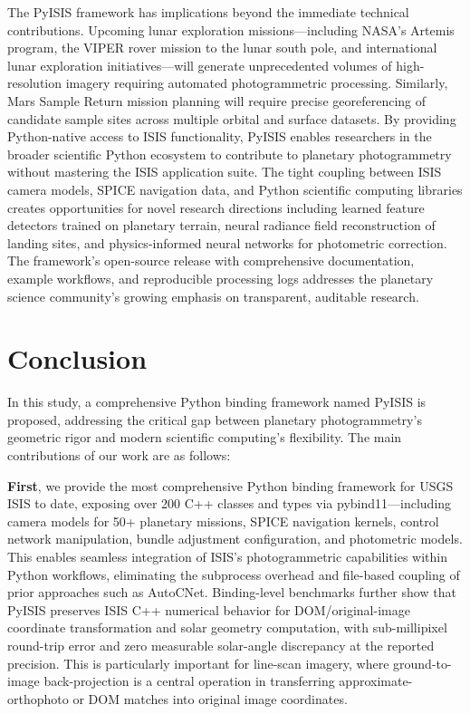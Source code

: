 \documentclass[lettersize,journal]{IEEEtran}
\newcommand{\pyisis}{PyISIS}
\begin{document}
The \pyisis{} framework has implications beyond the immediate technical contributions. Upcoming lunar exploration missions—including NASA's Artemis program, the VIPER rover mission to the lunar south pole, and international lunar exploration initiatives—will generate unprecedented volumes of high-resolution imagery requiring automated photogrammetric processing. Similarly, Mars Sample Return mission planning will require precise georeferencing of candidate sample sites across multiple orbital and surface datasets. By providing Python-native access to ISIS functionality, \pyisis{} enables researchers in the broader scientific Python ecosystem to contribute to planetary photogrammetry without mastering the ISIS application suite. The tight coupling between ISIS camera models, SPICE navigation data, and Python scientific computing libraries creates opportunities for novel research directions including learned feature detectors trained on planetary terrain, neural radiance field reconstruction of landing sites, and physics-informed neural networks for photometric correction. The framework's open-source release with comprehensive documentation, example workflows, and reproducible processing logs addresses the planetary science community's growing emphasis on transparent, auditable research.


\section{Conclusion}\label{sec:conclusion}

In this study, a comprehensive Python binding framework named \pyisis{} is proposed, addressing the critical gap between planetary photogrammetry's geometric rigor and modern scientific computing's flexibility. The main contributions of our work are as follows:

\textbf{First}, we provide the most comprehensive Python binding framework for USGS ISIS to date, exposing over 200 C++ classes and types via pybind11—including camera models for 50+ planetary missions, SPICE navigation kernels, control network manipulation, bundle adjustment configuration, and photometric models. This enables seamless integration of ISIS's photogrammetric capabilities within Python workflows, eliminating the subprocess overhead and file-based coupling of prior approaches such as AutoCNet. Binding-level benchmarks further show that \pyisis{} preserves ISIS C++ numerical behavior for DOM/original-image coordinate transformation and solar geometry computation, with sub-millipixel round-trip error and zero measurable solar-angle discrepancy at the reported precision. This is particularly important for line-scan imagery, where ground-to-image back-projection is a central operation in transferring approximate-orthophoto or DOM matches into original image coordinates.
\end{document}
